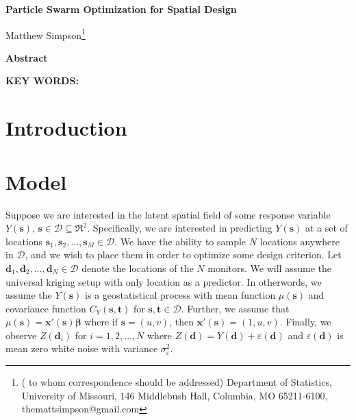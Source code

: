 \documentclass[12pt]{article}
\begin{document}
\thispagestyle{empty} \baselineskip=28pt

\begin{center}
{\LARGE{\bf Particle Swarm Optimization for Spatial Design}}
\end{center}

\baselineskip=12pt
\vskip 2mm
\blind
{
  \begin{center}
    Matthew Simpson\footnote{(\baselineskip=10pt to whom correspondence should be addressed)
      Department of Statistics, University of Missouri,
      146 Middlebush Hall, Columbia, MO 65211-6100, themattsimpson@gmail.com}
  \end{center}
} \fi

\vskip 2mm
\begin{center}
{\large{\bf Abstract}}
\end{center}
\baselineskip=12pt 

\baselineskip=12pt
\par\vfill\noindent
{\bf KEY WORDS:} 

\par\medskip\noindent


\clearpage\pagebreak\newpage {}
\baselineskip=24pt

\section{Introduction}

\section{Model}
Suppose we are interested in the latent spatial field of some response variable $Y(\bm{s})$, $\bm{s}\in \mathcal{D}\subseteq \Re^2$. Specifically, we are interested in predicting $Y(\bm{s})$ at a set of locations $\bm{s}_1, \bm{s}_2, \dots, \bm{s}_M\in\mathcal{D}$. We have the ability to sample $N$ locations anywhere in $\mathcal{D}$, and we wish to place them in order to optimize some design criterion. Let $\bm{d}_1, \bm{d}_2, \dots, \bm{d}_N\in\mathcal{D}$ denote the locations of the $N$ monitors. We will assume the universal kriging setup with only location as a predictor. In otherwords, we assume the $Y(\bm{s})$ is a geostatistical process with mean function $\mu(\bm{s})$ and covariance function $C_Y(\bm{s}, \bm{t})$ for $\bm{s},\bm{t}\in\mathcal{D}$. Further, we assume that $\mu(\bm{s}) = \bm{x}'(\bm{s})\bm{\beta}$ where if $\bm{s}=(u,v)$, then $\bm{x}'(\bm{s}) = (1, u, v)$. Finally, we observe $Z(\bm{d}_i)$ for $i=1,2,\dots,N$ where $Z(\bm{d}) = Y(\bm{d}) + \varepsilon(\bm{d})$ and $\varepsilon(\bm{d})$ is mean zero white noise with variance $\sigma^2_{\varepsilon}$. 
\end{document}
